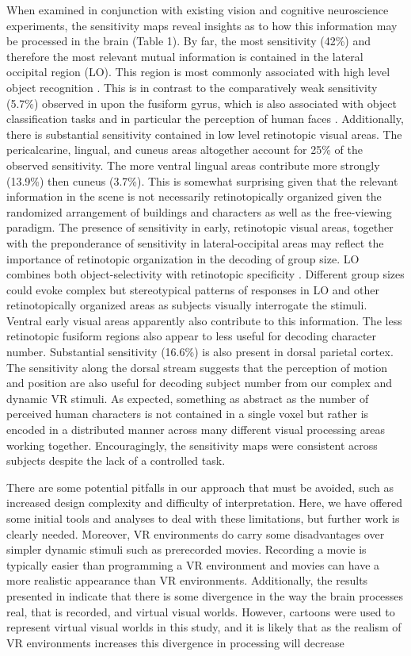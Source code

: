 \documentclass[authoryear]{elsarticle}
\begin{document}
When examined in conjunction with existing vision and cognitive neuroscience experiments, the sensitivity maps reveal insights as to how this information may be processed in the brain (Table 1).
By far, the most sensitivity (42\%) and therefore the most relevant mutual information is contained in the lateral occipital region (LO).
This region is most commonly associated with high level object recognition \citep{lateraloccipital}.
This is in contrast to the comparatively weak sensitivity (5.7\%) observed in upon the fusiform gyrus, which is also associated with object classification tasks and in particular the perception of human faces \citep{fusiform}.
Additionally, there is substantial sensitivity contained in low level retinotopic visual areas. The pericalcarine, lingual, and cuneus areas altogether account for 25\% of the observed sensitivity. The more ventral lingual areas contribute more strongly (13.9\%) then cuneus (3.7\%).
This is somewhat surprising given that the relevant information in the scene is not necessarily retinotopically organized given the randomized arrangement of buildings and characters as well as the free-viewing paradigm.
The presence of sensitivity in early, retinotopic visual areas, together with the preponderance of sensitivity in lateral-occipital areas may reflect the importance of retinotopic organization in the decoding of group size. LO combines both object-selectivity with retinotopic specificity \citep{Sayres2008}. Different group sizes could evoke complex but stereotypical patterns of responses in LO and other retinotopically organized areas as subjects visually interrogate the stimuli. Ventral early visual areas apparently also contribute to this information. The less retinotopic fusiform regions \citep{Sayres2010} also appear to less useful for decoding character number.
Substantial sensitivity (16.6\%) is also present in dorsal parietal cortex. The sensitivity along the dorsal stream suggests that the perception of motion and position are also useful for decoding subject number from our complex and dynamic VR stimuli.
As expected, something as abstract as the number of perceived human characters is not contained in a single voxel but rather is encoded in a distributed manner across many different visual processing areas working together.
Encouragingly, the sensitivity maps were consistent across subjects despite the lack of a controlled task.

There are some potential pitfalls in our approach that must be avoided, such as increased design complexity and difficulty of interpretation. 
Here, we have offered some initial tools and analyses to deal with these limitations, but further work is clearly needed.
Moreover, VR environments do carry some disadvantages over simpler dynamic stimuli such as prerecorded movies. Recording a movie is typically easier than programming a VR environment and movies can have a more realistic appearance than VR environments.
Additionally, the results presented in \cite{Han2005} indicate that there is some divergence in the way the brain processes real, that is recorded, and virtual visual worlds. 
However, cartoons were used to represent virtual visual worlds in this study, and it is likely that as the realism of VR environments increases this divergence in processing will decrease
\end{document}
